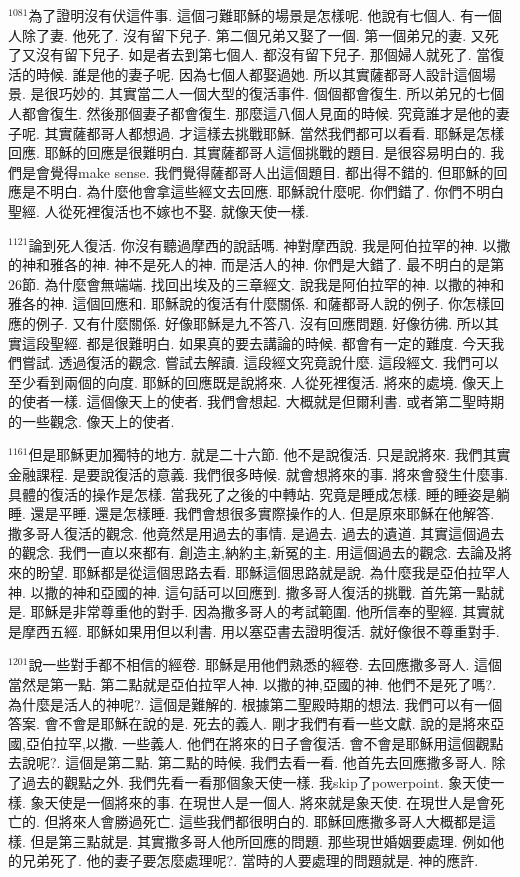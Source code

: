 \documentclass{book}
\begin{document}
$^{1081}$為了證明沒有伏這件事.
這個刁難耶穌的場景是怎樣呢.
他說有七個人.
有一個人除了妻.
他死了.
沒有留下兒子.
第二個兄弟又娶了一個.
第一個弟兄的妻.
又死了又沒有留下兒子.
如是者去到第七個人.
都沒有留下兒子.
那個婦人就死了.
當復活的時候.
誰是他的妻子呢.
因為七個人都娶過她.
所以其實薩都哥人設計這個場景.
是很巧妙的.
其實當二人一個大型的復活事件.
個個都會復生.
所以弟兄的七個人都會復生.
然後那個妻子都會復生.
那麼這八個人見面的時候.
究竟誰才是他的妻子呢.
其實薩都哥人都想過.
才這樣去挑戰耶穌.
當然我們都可以看看.
耶穌是怎樣回應.
耶穌的回應是很難明白.
其實薩都哥人這個挑戰的題目.
是很容易明白的.
我們是會覺得make sense.
我們覺得薩都哥人出這個題目.
都出得不錯的.
但耶穌的回應是不明白.
為什麼他會拿這些經文去回應.
耶穌說什麼呢.
你們錯了.
你們不明白聖經.
人從死裡復活也不嫁也不娶.
就像天使一樣.

$^{1121}$論到死人復活.
你沒有聽過摩西的說話嗎.
神對摩西說.
我是阿伯拉罕的神.
以撒的神和雅各的神.
神不是死人的神.
而是活人的神.
你們是大錯了.
最不明白的是第26節.
為什麼會無端端.
找回出埃及的三章經文.
說我是阿伯拉罕的神.
以撒的神和雅各的神.
這個回應和.
耶穌說的復活有什麼關係.
和薩都哥人說的例子.
你怎樣回應的例子.
又有什麼關係.
好像耶穌是九不答八.
沒有回應問題.
好像彷彿.
所以其實這段聖經.
都是很難明白.
如果真的要去講論的時候.
都會有一定的難度.
今天我們嘗試.
透過復活的觀念.
嘗試去解讀.
這段經文究竟說什麼.
這段經文.
我們可以至少看到兩個的向度.
耶穌的回應既是說將來.
人從死裡復活.
將來的處境.
像天上的使者一樣.
這個像天上的使者.
我們會想起.
大概就是但爾利書.
或者第二聖時期的一些觀念.
像天上的使者.

$^{1161}$但是耶穌更加獨特的地方.
就是二十六節.
他不是說復活.
只是說將來.
我們其實金融課程.
是要說復活的意義.
我們很多時候.
就會想將來的事.
將來會發生什麼事.
具體的復活的操作是怎樣.
當我死了之後的中轉站.
究竟是睡成怎樣.
睡的睡姿是躺睡.
還是平睡.
還是怎樣睡.
我們會想很多實際操作的人.
但是原來耶穌在他解答.
撒多哥人復活的觀念.
他竟然是用過去的事情.
是過去.
過去的遺道.
其實這個過去的觀念.
我們一直以來都有.
創造主,納約主,新冤的主.
用這個過去的觀念.
去論及將來的盼望.
耶穌都是從這個思路去看.
耶穌這個思路就是說.
為什麼我是亞伯拉罕人神.
以撒的神和亞國的神.
這句話可以回應到.
撒多哥人復活的挑戰.
首先第一點就是.
耶穌是非常尊重他的對手.
因為撒多哥人的考試範圍.
他所信奉的聖經.
其實就是摩西五經.
耶穌如果用但以利書.
用以塞亞書去證明復活.
就好像很不尊重對手.

$^{1201}$說一些對手都不相信的經卷.
耶穌是用他們熟悉的經卷.
去回應撒多哥人.
這個當然是第一點.
第二點就是亞伯拉罕人神.
以撒的神,亞國的神.
他們不是死了嗎?.
為什麼是活人的神呢?.
這個是難解的.
根據第二聖殿時期的想法.
我們可以有一個答案.
會不會是耶穌在說的是.
死去的義人.
剛才我們有看一些文獻.
說的是將來亞國,亞伯拉罕,以撒.
一些義人.
他們在將來的日子會復活.
會不會是耶穌用這個觀點去說呢?.
這個是第二點.
第二點的時候.
我們去看一看.
他首先去回應撒多哥人.
除了過去的觀點之外.
我們先看一看那個象天使一樣.
我skip了powerpoint.
象天使一樣.
象天使是一個將來的事.
在現世人是一個人.
將來就是象天使.
在現世人是會死亡的.
但將來人會勝過死亡.
這些我們都很明白的.
耶穌回應撒多哥人大概都是這樣.
但是第三點就是.
其實撒多哥人他所回應的問題.
那些現世婚姻要處理.
例如他的兄弟死了.
他的妻子要怎麼處理呢?.
當時的人要處理的問題就是.
神的應許.
\end{document}
